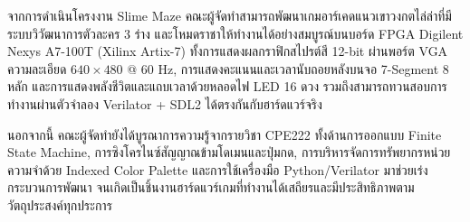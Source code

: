 \clearpage
{}

จากการดำเนินโครงงาน Slime Maze คณะผู้จัดทำสามารถพัฒนาเกมอาร์เคดแนวเขาวงกตไล่ล่าที่มีระบบวิวัฒนาการตัวละคร 3 ร่าง และโหมดราชาให้ทำงานได้อย่างสมบูรณ์บนบอร์ด FPGA Digilent Nexys A7-100T (Xilinx Artix-7) ทั้งการแสดงผลกราฟิกสไปรต์สี 12-bit ผ่านพอร์ต VGA ความละเอียด $640\times480$ @ 60 Hz, การแสดงคะแนนและเวลานับถอยหลังบนจอ 7-Segment 8 หลัก และการแสดงพลังชีวิตและแถบเวลาด้วยหลอดไฟ LED 16 ดวง รวมถึงสามารถทวนสอบการทำงานผ่านตัวจำลอง Verilator + SDL2 ได้ตรงกันกับฮาร์ดแวร์จริง

นอกจากนี้ คณะผู้จัดทำยังได้บูรณาการความรู้จากรายวิชา CPE222 ทั้งด้านการออกแบบ Finite State Machine, การซิงโครไนซ์สัญญาณข้ามโดเมนและปุ่มกด, การบริหารจัดการทรัพยากรหน่วยความจำด้วย Indexed Color Palette และการใช้เครื่องมือ Python/Verilator มาช่วยเร่งกระบวนการพัฒนา จนเกิดเป็นชิ้นงานฮาร์ดแวร์เกมที่ทำงานได้เสถียรและมีประสิทธิภาพตามวัตถุประสงค์ทุกประการ
